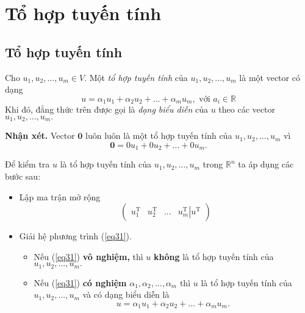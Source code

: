 \section{Tổ hợp tuyến tính}
\subsection{Tổ hợp tuyến tính}
Cho $u_1, u_2, ..., u_m \in V.$ Một \textit{tổ hợp tuyến tính} của $u_1, u_2, ..., u_m$ là một vector có dạng
$$u = {\alpha _1}{u_1} + {\alpha _2}{u_2} + ... + {\alpha _m}{u_m}, \text{  với }{a_i} \in \mathbb{R} $$
Khi đó, đẳng thức trên được gọi là \textit{dạng biểu diễn} của $u$ theo các vector $u_1, u_2, ..., u_m.$
\begin{mybox}
\textbf{Nhận xét.} Vector $\mathbf{0}$ luôn luôn là một tổ hợp tuyến tính của $u_1, u_2, ..., u_m$ vì
$$\mathbf{0} = 0{u_1} + 0{u_2} + ... + 0{u_m}.$$
\end{mybox}
Để kiểm tra $u$ là tổ hợp tuyến tính của $u_1, u_2, ..., u_m$ trong $\mathbb{R}^n$ ta áp dụng các bước sau:
\begin{itemize}
\item Lập ma trận mở rộng 
\begin{equation}
\left( {\begin{array}{*{20}{c}}
  {u_1^{\mathrm{T}}}&{u_2^{\mathrm{T}}}&{...}&{\left. {u_m^{\mathrm{T}}} \right|{u^{\mathrm{T}}}} 
\end{array}} \right)
\label{eq31}
\end{equation}
\item Giải hệ phương trình (\ref{eq31}).
\begin{itemize}
\item Nếu (\ref{eq31}) \textbf{vô nghiệm,} thì $u$ \textbf{không} là tổ hợp tuyến tính của $u_1, u_2, ..., u_m.$
\item Nếu (\ref{eq31}) \textbf{có nghiệm} ${\alpha _1},{\alpha _2},...,{\alpha _m}$ thì $u$ là tổ hợp tuyến tính của $u_1, u_2, ..., u_m$ và có dạng biểu diễn là
$$u = {\alpha _1}{u_1} + {\alpha _2}{u_2} + ... + {\alpha _m}{u_m}.$$
\end{itemize}
\end{itemize} 
